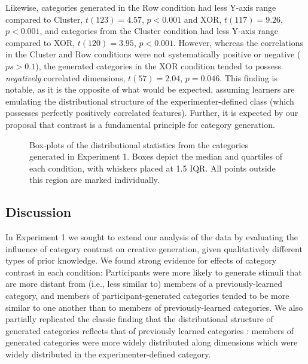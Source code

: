 \documentclass[12pt]{article}
\newcommand\inputpgf[2]{{
\let\pgfimageWithoutPath\pgfimage
\renewcommand{\pgfimage}[2][]{\pgfimageWithoutPath[##1]{#1/##2}}

}}
\begin{document}
\begin{flushleft}
Likewise, categories generated in the Row condition had less Y-axis range compared to Cluster, $t(123) = 4.57$, $p < 0.001$ and XOR, $t(117) = 9.26$, $p < 0.001$, and categories from the Cluster condition had less Y-axis range compared to XOR, $t(120) = 3.95$, $p < 0.001$. However, whereas the correlations in the Cluster and Row conditions were not systematically positive or negative ($ps > 0.1$), the generated categories in the XOR condition tended to possess \textit{negatively} correlated dimensions, $t(57) = 2.04$, $p = 0.046$. This finding is notable, as it is the opposite of what would be expected, assuming learners are emulating the distributional structure of the experimenter-defined class (which possesses perfectly positively correlated features). Further, it is expected by our proposal that contrast is a fundamental principle for category generation.

\begin{figure}
    \begin{center}
    \inputpgf{figs/}{e1-statsboxes.pgf}
    \caption{Box-plots of the distributional statistics from the categories generated in Experiment 1. Boxes depict the median and quartiles of each condition, with whiskers placed at 1.5 IQR. All points outside this region are marked individually.}
    \label{fig:e1-statsboxes}
    \end{center}
\end{figure}


\subsection{Discussion}


In Experiment 1 we sought to extend our analysis of the \cite{jern2013probabilistic} data by evaluating the influence of category contrast on creative generation, given qualitatively different types of prior knowledge. We found strong evidence for effects of category contrast in each condition: Participants were more likely to generate stimuli that are more distant from (i.e., less similar to) members of a previously-learned category, and members of participant-generated categories tended to be more similar to one another than to members of previously-learned categories. We also partially replicated the classic finding that the distributional structure of generated categories reflects that of previously learned categories \citep{jern2013probabilistic,ward1994structured}: members of generated categories were more widely distributed along dimensions which were widely distributed in the experimenter-defined category. 


\end{flushleft}
\end{document}
